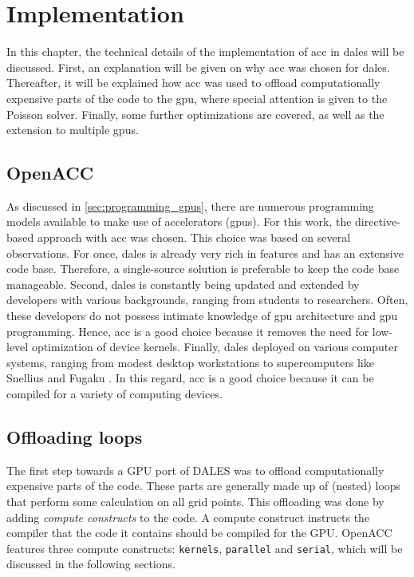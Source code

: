 \chapter{Implementation} \label{chap:implementation}
In this chapter, the technical details of the implementation of \acrshort{acc} in \acrshort{dales} will be discussed. First, an explanation will be given on why \acrshort{acc} was chosen for \acrshort{dales}. Thereafter, it will be explained how \acrshort{acc} was used to offload computationally expensive parts of the code to the \acrshort{gpu}, where special attention is given to the Poisson solver. Finally, some further optimizations are covered, as well as the extension to multiple \acrshort{gpu}s.

\section{OpenACC}
As discussed in \autoref{sec:programming_gpus}, there are numerous programming models available to make use of accelerators (\acrshort{gpu}s). For this work, the directive-based approach with \acrshort{acc} was chosen. This choice was based on several observations. For once, \acrshort{dales} is already very rich in features and has an extensive code base. Therefore, a single-source solution is preferable to keep the code base manageable. Second, \acrshort{dales} is constantly being updated and extended by developers with various backgrounds, ranging from students to researchers. Often, these developers do not possess intimate knowledge of \acrshort{gpu} architecture and \acrshort{gpu} programming. Hence, \acrshort{acc} is a good choice because it removes the need for low-level optimization of device kernels. Finally, \acrshort{dales} deployed on various computer systems, ranging from modest desktop workstations to supercomputers like Snellius and Fugaku \citep{janssonCloudBotanyShallow2023}. In this regard, \acrshort{acc} is a good choice because it can be compiled for a variety of computing devices.

\section{Offloading loops}
The first step towards a GPU port of DALES was to offload computationally expensive parts of the code. These parts are generally made up of (nested) loops that perform some calculation on all grid points. This offloading was done by adding \emph{compute constructs} to the code. A compute construct instructs the compiler that the code it contains should be compiled for the GPU. OpenACC features three compute constructs: \texttt{kernels}, \texttt{parallel} and \texttt{serial}, which will be discussed in the following sections. 


